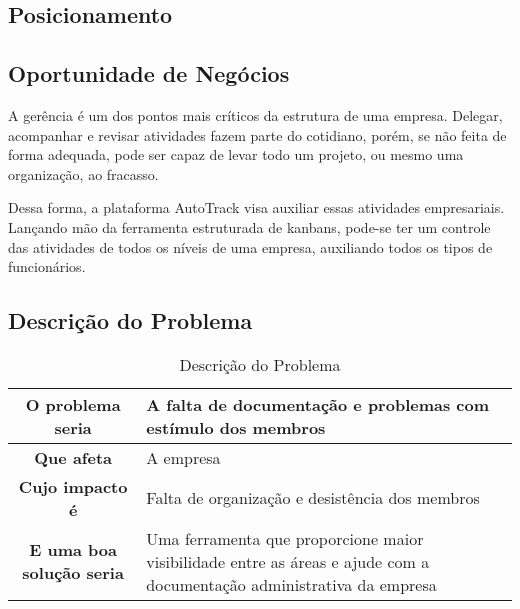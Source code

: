 \begin{apendicesenv}
\section{Posicionamento}
\subsection{Oportunidade de Negócios}
A gerência é um dos pontos mais críticos da estrutura de uma empresa. Delegar, acompanhar e revisar atividades fazem parte do cotidiano, porém, se não feita de forma adequada, pode ser capaz de levar todo um projeto, ou mesmo uma organização, ao fracasso.

Dessa forma, a plataforma AutoTrack visa auxiliar essas atividades empresariais. Lançando mão da ferramenta estruturada de kanbans, pode-se ter um controle das atividades de todos os níveis de uma empresa, auxiliando todos os tipos de funcionários.

\subsection{Descrição do Problema}

\begin{table}[!h]
  \centering
  \caption{Descrição do Problema}
  \begin{tabular}{|c|l|}
    \hline
    \textbf{O problema seria}        & \parbox[t]{9cm}{A falta de documentação e problemas com estímulo dos membros} \\ \hline
    \textbf{Que afeta}               & A empresa                                                                                                                                             \\ \hline
    \textbf{Cujo impacto é}          & \parbox[t]{9cm}{Falta de organização e desistência dos membros}                                                                                                        \\ \hline
    \textbf{E uma boa solução seria} & \parbox[t]{9cm}{Uma ferramenta que proporcione maior visibilidade entre as áreas e ajude com a documentação administrativa da empresa}                                 \\ \hline
  \end{tabular}
\end{table}


\end{apendicesenv}
